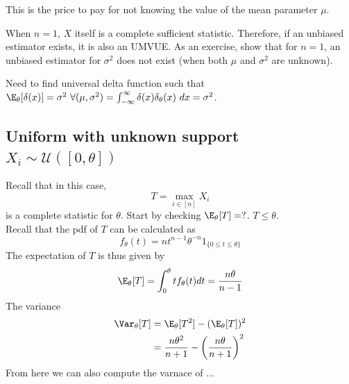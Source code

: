 This is the price to pay for not knowing the value of the mean parameter $\mu$.

When $n=1$, $X$ itself is a complete sufficient statistic. Therefore, if an unbiased estimator exists, it is also an UMVUE. As an
exercise, show that for $n=1$, an unbiased estimator for $\sigma^2$ does not exist (when both $\mu$ and $\sigma^2$ are unknown).

Need to find universal delta function such that $\E_\theta[\delta(x)] = \sigma^2 \ \forall(\mu, \sigma^2) = \int_{-\infty}^{\infty} \delta(x) \delta_\theta(x) \ dx = \sigma^2$.
\newpage
\subsection{Uniform with unknown support $X_i \sim \mathcal{U}([0, \theta])$}
Recall that in this case,
\[
    T = \max_{i \in [n]} X_i
\]
is a complete statistic for $\theta$. Start by checking $\E_\theta[T] = ?$. $T \leq \theta$. \\

\noindent Recall that the pdf of $T$ can be calculated as
\[
    f_\theta(t) = nt^{n-1} \theta^{-n} 1_{\{0\leq t \leq \theta \}}
\]
The expectation of $T$ is thus given by
\[
    \E_\theta[T] = \int_{0}^\theta t f_\theta(t) dt = \frac{n\theta}{n-1}
\]
The variance
\begin{align*}
    \Var_\theta[T] & = \E_\theta[T^2] - (\E_\theta[T])^2                          \\
                   & = \frac{n\theta^2}{n+1} - \left(\frac{n\theta}{n+1}\right)^2
\end{align*}
From here we can also compute the varnace of ...